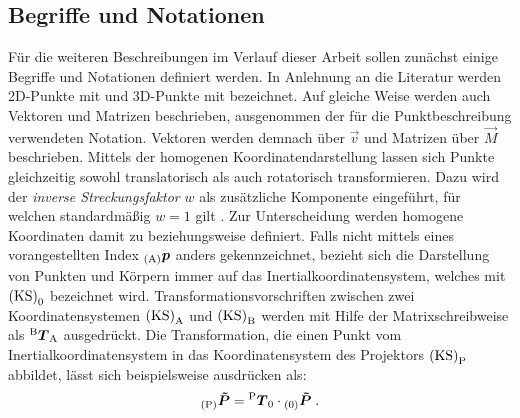 \subsection{Begriffe und Notationen}
Für die weiteren Beschreibungen im Verlauf dieser Arbeit sollen zunächst einige Begriffe und Notationen definiert werden. In Anlehnung an die Literatur \cite{Zhang2000} werden 2D-Punkte mit  und 3D-Punkte mit  bezeichnet. Auf gleiche Weise werden auch Vektoren und Matrizen beschrieben, ausgenommen der für die Punktbeschreibung verwendeten Notation. Vektoren werden demnach über $\vec{v}$ und Matrizen über $\vec{M}$ beschrieben. Mittels der homogenen Koordinatendarstellung lassen sich Punkte gleichzeitig sowohl translatorisch als auch rotatorisch transformieren. Dazu wird der \textit{inverse Streckungsfaktor} $w$ als zusätzliche Komponente eingeführt, für welchen standardmäßig $w=1$ gilt \cite{Nischwitz20111}. Zur Unterscheidung werden homogene Koordinaten damit zu  beziehungsweise  definiert. Falls nicht mittels eines vorangestellten Index ${_{{\mathrm{(A)}}}}\mbox{\boldmath{$p$}}$ anders gekennzeichnet, bezieht sich die Darstellung von Punkten und Körpern immer auf das Inertialkoordinatensystem, welches mit ${\mathrm{(KS)}}_{\mathrm{0}}$ bezeichnet wird. Transformationsvorschriften zwischen zwei Koordinatensystemen ${\mathrm{(KS)}}_{\mathrm{A}}$ und ${\mathrm{(KS)}}_{\mathrm{B}}$ werden mit Hilfe der Matrixschreibweise als ${^{\mathrm{B}}\mbox{\boldmath{$T$}}_{\mathrm{A}}}$ ausgedrückt. Die Transformation, die einen Punkt vom Inertialkoordinatensystem in das Koordinatensystem des Projektors ${\mathrm{(KS)}}_{\mathrm{P}}$ abbildet, lässt sich beispielsweise ausdrücken als:%
%
\begin{equation}
{_{{\mathrm{(P)}}}}\mbox{\boldmath{$\tilde{P}$}} = {^{\mathrm{P}}\mbox{\boldmath{$T$}}_{\mathrm{0}}}\cdot{_{{\mathrm{(0)}}}}\mbox{\boldmath{$\tilde{P}$}} \; \text{.}
\end{equation}



